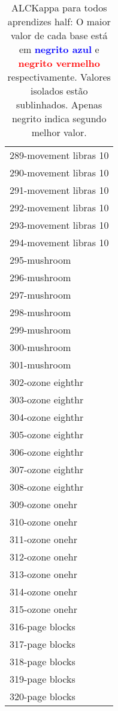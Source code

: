 \begin{table}[h]
\caption{ALCKappa para todos aprendizes half: O maior valor de cada base está em \textcolor{blue}{\textbf{negrito azul}} e \textcolor{red}{\textbf{negrito vermelho}} respectivamente. Valores isolados estão sublinhados. Apenas negrito indica segundo melhor valor.}
\begin{center}\begin{tabular}{l}
 & \\ \hline 289-movement libras 10 &  \\
290-movement libras 10 &  \\
291-movement libras 10 &  \\
292-movement libras 10 &  \\
293-movement libras 10 &  \\
294-movement libras 10 &  \\
295-mushroom &  \\ \hline
296-mushroom &  \\
297-mushroom &  \\
298-mushroom &  \\
299-mushroom &  \\
300-mushroom &  \\
301-mushroom &  \\
302-ozone eighthr &  \\ \hline
303-ozone eighthr &  \\
304-ozone eighthr &  \\
305-ozone eighthr &  \\
306-ozone eighthr &  \\
307-ozone eighthr &  \\
308-ozone eighthr &  \\
309-ozone onehr &  \\ \hline
310-ozone onehr &  \\
311-ozone onehr &  \\
312-ozone onehr &  \\
313-ozone onehr &  \\
314-ozone onehr &  \\
315-ozone onehr &  \\
316-page blocks &  \\ \hline
317-page blocks &  \\
318-page blocks &  \\
319-page blocks &  \\
320-page blocks &  \\\end{tabular}\label{stratsALCKappa9AllReduxHalfb}
\end{center}
\end{table}
